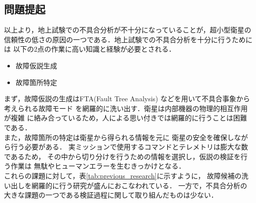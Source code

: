 \documentclass[11pt]{jsarticle}%
\begin{document}
\begin{multicols}{2}
  \subsection{問題提起}
  \vspace{-1zh}
  以上より，地上試験での不具合分析が不十分になっていることが，超小型衛星の
  信頼性の低さの原因の一つである．地上試験での不具合分析を十分に行うためには
  以下の2点の作業に高い知識と経験が必要とされる．
  \begin{itemize}
    \item 故障仮説生成
    \item 故障箇所特定%
  \end{itemize}
  まず，故障仮説の生成はFTA(Fault Tree Analysis)%
  などを用いて不具合事象から考えられる故障モード
  を網羅的に洗い出す．衛星は内部機器の物理的相互作用が複雑
  に絡み合っているため，人による思い付きでは網羅的に行うことは困難である．\\
  また，故障箇所の特定は衛星から得られる情報を元に
  衛星の安全を確保しながら行う必要がある．
  実ミッションで使用するコマンドとテレメトリは膨大な数であるため，
その中から切り分けを行うための情報を選択し，仮説の検証を行う作業は
無駄やヒューマンエラーを生むきっかけとなる．\\
これらの課題に対して，表\ref{tab:previous_research}に示すように，
故障候補の洗い出しを網羅的に行う研究が盛んにおこなわれている．
一方で，不具合分析の大きな課題の一つである検証過程に関して取り組んだものは少ない．
\vspace{-1zh}
\begin{table}[H]
  \centering
  \caption{不具合分析手法の比較}
  \label{tab:previous_research}
\end{table}
\vspace{-1zh}

\end{multicols}
\end{document}
